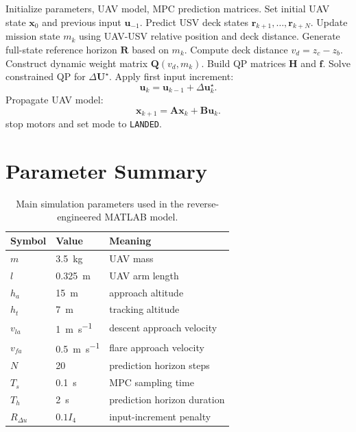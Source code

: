 \documentclass[12pt,a4paper]{article}
\begin{document}
\begin{algorithm}[H]
\caption{Reverse-engineered MPC-FAA landing algorithm}
\begin{algorithmic}[1]
\State Initialize parameters, UAV model, MPC prediction matrices.
\State Set initial UAV state $\bm{x}_0$ and previous input $\bm{u}_{-1}$.
    \State Predict USV deck states $\bm{r}_{k+1},\ldots,\bm{r}_{k+N}$.
    \State Update mission state $m_k$ using UAV-USV relative position and deck distance.
    \State Generate full-state reference horizon $\bm{R}$ based on $m_k$.
    \State Compute deck distance $v_d=z_c-z_b$.
    \State Construct dynamic weight matrix $\bm{Q}(v_d,m_k)$.
    \State Build QP matrices $\bm{H}$ and $\bm{f}$.
    \State Solve constrained QP for $\Delta\bm{U}^{\star}$.
    \State Apply first input increment:
    \[
        \bm{u}_{k}=\bm{u}_{k-1}+\Delta\bm{u}_{k}^{\star}.
    \]
    \State Propagate UAV model:
    \[
        \bm{x}_{k+1}=\bm{A}\bm{x}_{k}+\bm{B}\bm{u}_{k}.
    \]
        \State stop motors and set mode to \texttt{LANDED}.
    \EndIf
\EndFor
\end{algorithmic}
\end{algorithm}

\section{Parameter Summary}

\begin{table}[H]
\centering
\caption{Main simulation parameters used in the reverse-engineered MATLAB model.}
\begin{tabular}{lll}
\toprule
Symbol & Value & Meaning\\
\midrule
$m$ & \SI{3.5}{kg} & UAV mass\\
$l$ & \SI{0.325}{m} & UAV arm length\\
$h_a$ & \SI{15}{m} & approach altitude\\
$h_t$ & \SI{7}{m} & tracking altitude\\
$v_{la}$ & \SI{1}{m.s^{-1}} & descent approach velocity\\
$v_{fa}$ & \SI{0.5}{m.s^{-1}} & flare approach velocity\\
$N$ & 20 & prediction horizon steps\\
$T_s$ & \SI{0.1}{s} & MPC sampling time\\
$T_h$ & \SI{2}{s} & prediction horizon duration\\
$R_{\Delta u}$ & $0.1I_4$ & input-increment penalty\\
\bottomrule
\end{tabular}
\end{table}
\end{document}
